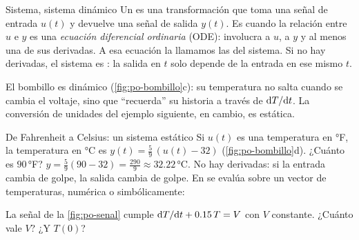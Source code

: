 \begin{definicion}[label=def:po-sistema]{Sistema, sistema dinámico}
Un  es una transformación que toma una señal de entrada $u(t)$ y devuelve una señal de salida $y(t)$. Es  cuando la relación entre $u$ e $y$ es una \emph{ecuación diferencial ordinaria} (ODE): involucra a $u$, a $y$ y al menos una de sus derivadas. A esa ecuación la llamamos las  del sistema. Si no hay derivadas, el sistema es : la salida en $t$ solo depende de la entrada en ese mismo $t$.
\end{definicion}

El bombillo es dinámico (\cref{fig:po-bombillo}c): su temperatura no salta cuando se cambia el voltaje, sino que ``recuerda'' su historia a través de $\mathrm{d} T/\mathrm{d} t$. La conversión de unidades del ejemplo siguiente, en cambio, es estática.

\begin{ejemplo}[label=ej:po-fc]{De Fahrenheit a Celsius: un sistema estático}
Si $u(t)$ es una temperatura en °F, la temperatura en °C es $y(t)=\tfrac59\,(u(t)-32)$ (\cref{fig:po-bombillo}d). ¿Cuánto es $90$\,°F?
\solucion $y=\tfrac59(90-32)=\tfrac{290}{9}\approx32.22$\,°C. No hay derivadas: si la entrada cambia de golpe, la salida cambia de golpe. En \matlab se evalúa sobre un vector de temperaturas, numérica o simbólicamente:
\end{ejemplo}

\begin{pausa}
La señal de la \cref{fig:po-senal} cumple $\mathrm{d} T/\mathrm{d} t+0.15\,T=V$ con $V$ constante. ¿Cuánto vale $V$? ¿Y $T(0)$?
\end{pausa}
